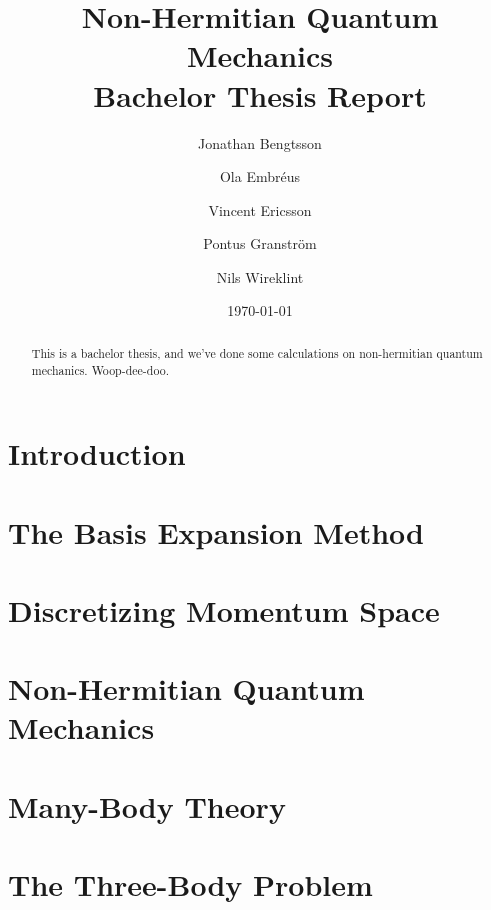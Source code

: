 \documentclass[12pt,a4paper]{report}
\begin{document}
  


\title{Non-Hermitian Quantum Mechanics\\
\Large Bachelor Thesis Report}
\author{Jonathan Bengtsson  \and Ola Embréus \and Vincent Ericsson \and Pontus Granström \and Nils Wireklint}
\date{\today}



\maketitle

\newpage
\begin{abstract}
This is a bachelor thesis, and we've done some calculations on non-hermitian quantum mechanics. Woop-dee-doo.
\end{abstract}
\newpage

\tableofcontents

\newpage

\chapter{Introduction}
\label{cha:introduction}



\chapter{The Basis Expansion Method}
\label{cha:basis_expansion}



\chapter{Discretizing Momentum Space}
\label{cha:mom_space}


\chapter{Non-Hermitian Quantum Mechanics} 
\label{cha:nhqm}



\chapter{Many-Body Theory}
\label{cha:many_body}




\chapter{The Three-Body Problem}
\label{cha:three_body}
\end{document}
